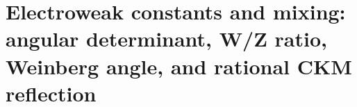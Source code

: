 \chapter{Electroweak constants and mixing: angular determinant, W/Z ratio, Weinberg angle, and rational CKM reflection}
\label{chap:p3-final:49:sector_electrodebil}





